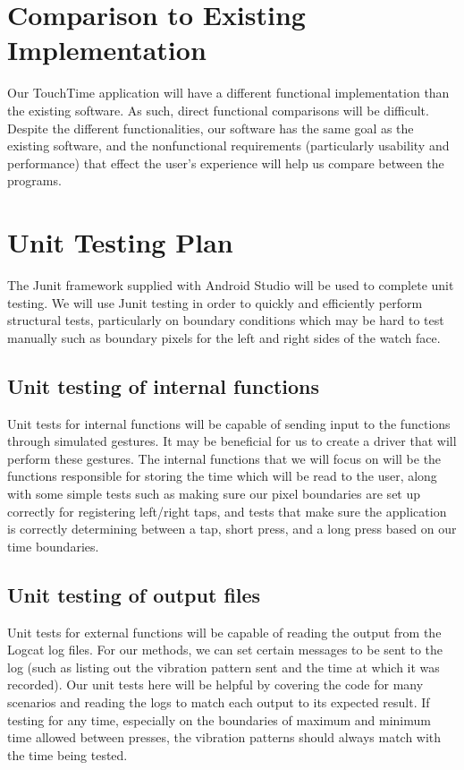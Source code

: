 \section{Comparison to Existing Implementation}	
Our TouchTime application will have a different functional implementation than the existing software. As such, direct functional comparisons will be difficult. Despite the different functionalities, our software has the same goal as the existing software, and the nonfunctional requirements (particularly usability and performance) that effect the user's experience will help us compare between the programs.
				
\section{Unit Testing Plan}
The Junit framework supplied with Android Studio will be used to complete unit testing. We will use Junit testing in order to quickly and efficiently perform structural tests, particularly on boundary conditions which may be hard to test manually such as boundary pixels for the left and right sides of the watch face.
		
\subsection{Unit testing of internal functions}
Unit tests for internal functions will be capable of sending input to the functions through simulated gestures. It may be beneficial for us to create a driver that will perform these gestures. The internal functions that we will focus on will be the functions responsible for storing the time which will be read to the user, along with some simple tests such as making sure our pixel boundaries are set up correctly for registering left/right taps, and tests that make sure the application is correctly determining between a tap, short press, and a long press based on our time boundaries. 
		
\subsection{Unit testing of output files}		
Unit tests for external functions will be capable of reading the output from the Logcat log files. For our methods, we can set certain messages to be sent to the log (such as listing out the vibration pattern sent and the time at which it was recorded). Our unit tests here will be helpful by covering the code for many scenarios and reading the logs to match each output to its expected result. If testing for any time, especially on the boundaries of maximum and minimum time allowed between presses, the vibration patterns should always match with the time being tested.

